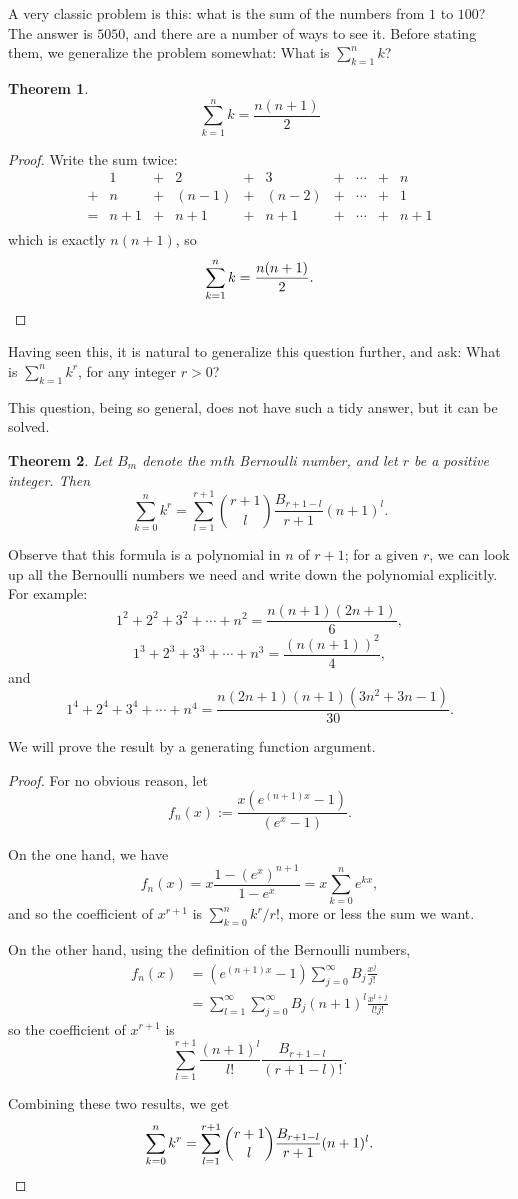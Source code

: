 \documentclass[12pt]{article}
\newtheorem{theorem}{Theorem}
\begin{document}
A very classic problem is this: what is the sum of the numbers from $1$ to $100$?  The answer is $5050$, and there are a number of ways to see it.  Before stating them, we generalize the problem somewhat: What is $\sum_{k=1}^n k$?

\begin{theorem}
\[
\sum_{k=1}^n k = \frac{n(n+1)}{2}
\]
\end{theorem}
\begin{proof}
Write the sum twice:
\[
\begin{array}{cccccccccc}
  & 1   & + & 2     & + & 3     & + & \cdots & + & n \\
+ & n   & + & (n-1) & + & (n-2) & + & \cdots & + & 1 \\
= & n+1 & + & n+1   & + & n+1   & + & \cdots & + & n+1 \\
\end{array}
\]
which is exactly $n(n+1)$, so 
\[
\sum_{k=1}^n k = \frac{n(n+1)}{2}.\qedhere
\]
\end{proof}

Having seen this, it is natural to generalize this question further, and ask: What is $\sum_{k=1}^n k^r$, for any integer $r>0$?

This question, being so general, does not have such a tidy answer, but it can be solved.

\begin{theorem}
Let $B_m$ denote the $m$th Bernoulli number, and let $r$ be a positive integer.  Then
\[
\sum_{k=0}^n k^r = \sum_{l=1}^{r+1} \binom{r+1}{l}\frac{B_{r+1-l}}{r+1}(n+1)^l.
\]
\end{theorem}
Observe that this formula is a polynomial in $n$ of  $r+1$; for a given $r$, we can look up all the Bernoulli numbers we need and write down the polynomial explicitly. For example:
\[
1^2 + 2^2 + 3^2 + \cdots + n^2 = \frac{n(n+1)(2n+1)}{6},
\]
\[
1^3 + 2^3 + 3^3 + \cdots + n^3 = \frac{(n(n+1))^2}{4},
\]
and
\[
1^4 + 2^4 + 3^4 + \cdots + n^4 = \frac{n(2n+1)(n+1)(3n^2+3n-1)}{30}.
\]

We will prove the result by a generating function argument.
\begin{proof}
For no obvious reason, let
\[
f_n(x) := \frac{x(e^{(n+1)x} - 1)}{(e^x-1)}.
\]

On the one hand, we have
\[
f_n(x) = x\frac{1-(e^x)^{n+1}}{1-e^x} = x\sum_{k=0}^{n} e^{kx}, 
\]
and so the coefficient of $x^{r+1}$ is $\sum_{k=0}^{n} k^r/r!$, more or less the sum we want.

On the other hand, using the definition of the Bernoulli numbers, 
\begin{align*}
f_n(x) & = (e^{(n+1)x}-1) \sum_{j=0}^{\infty} B_j \frac{x^j}{j!}\\
       & = \sum_{l=1}^{\infty} \sum_{j=0}^{\infty} B_j (n+1)^l \frac{x^{l+j}}{l!j!}
\end{align*}
so the coefficient of $x^{r+1}$ is 
\[
\sum_{l=1}^{r+1} \frac{(n+1)^l}{l!}\frac{B_{r+1-l}}{(r+1-l)!}.
\]

Combining these two results, we get
\[
\sum_{k=0}^n k^r = \sum_{l=1}^{r+1} \binom{r+1}{l}\frac{B_{r+1-l}}{r+1}(n+1)^l.\qedhere
\]
\end{proof}
\end{document}
